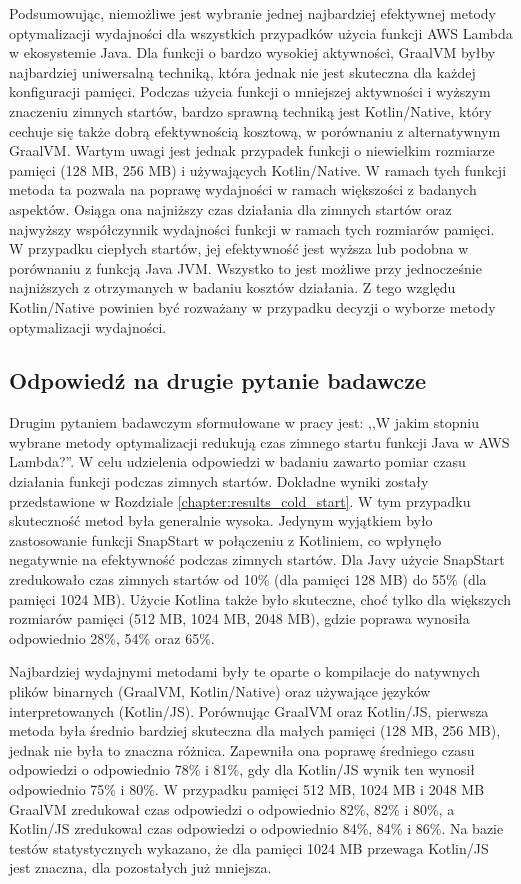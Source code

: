 Podsumowując, niemożliwe jest wybranie jednej najbardziej efektywnej metody optymalizacji wydajności dla wszystkich przypadków użycia funkcji AWS Lambda w ekosystemie Java.
Dla funkcji o bardzo wysokiej aktywności, GraalVM byłby najbardziej uniwersalną techniką, która jednak nie jest skuteczna dla każdej konfiguracji pamięci.
Podczas użycia funkcji o mniejszej aktywności i wyższym znaczeniu zimnych startów, bardzo sprawną techniką jest Kotlin/Native, który cechuje się także dobrą efektywnością kosztową, w porównaniu z alternatywnym GraalVM.
Wartym uwagi jest jednak przypadek funkcji o niewielkim rozmiarze pamięci (128 MB, 256 MB) i używających Kotlin/Native.
W ramach tych funkcji metoda ta pozwala na poprawę wydajności w ramach większości z badanych aspektów.
Osiąga ona najniższy czas działania dla zimnych startów oraz najwyższy współczynnik wydajności funkcji w ramach tych rozmiarów pamięci.
W przypadku ciepłych startów, jej efektywność jest wyższa lub podobna w porównaniu z funkcją Java JVM.
Wszystko to jest możliwe przy jednocześnie najniższych z otrzymanych w badaniu kosztów działania.
Z tego względu Kotlin/Native powinien być rozważany w przypadku decyzji o wyborze metody optymalizacji wydajności.

\subsection*{Odpowiedź na drugie pytanie badawcze}

Drugim pytaniem badawczym sformułowane w pracy jest: ,,W jakim stopniu wybrane metody optymalizacji redukują czas zimnego startu funkcji Java w AWS Lambda?''.
W celu udzielenia odpowiedzi w badaniu zawarto pomiar czasu działania funkcji podczas zimnych startów.
Dokładne wyniki zostały przedstawione w Rozdziale \ref{chapter:results_cold_start}.
W tym przypadku skuteczność metod była generalnie wysoka.
Jedynym wyjątkiem było zastosowanie funkcji SnapStart w połączeniu z Kotliniem, co wpłynęło negatywnie na efektywność podczas zimnych startów.
Dla Javy użycie SnapStart zredukowało czas zimnych startów od 10\% (dla pamięci 128 MB) do 55\% (dla pamięci 1024 MB).
Użycie Kotlina także było skuteczne, choć tylko dla większych rozmiarów pamięci (512 MB, 1024 MB, 2048 MB), gdzie poprawa wynosiła odpowiednio 28\%, 54\% oraz 65\%.

Najbardziej wydajnymi metodami były te oparte o kompilacje do natywnych plików binarnych (GraalVM, Kotlin/Native) oraz używające języków interpretowanych (Kotlin/JS).
Porównując GraalVM oraz Kotlin/JS, pierwsza metoda była średnio bardziej skuteczna dla małych pamięci (128 MB, 256 MB), jednak nie była to znaczna różnica.
Zapewniła ona poprawę średniego czasu odpowiedzi o odpowiednio 78\% i 81\%, gdy dla Kotlin/JS wynik ten wynosił odpowiednio 75\% i 80\%.
W przypadku pamięci 512 MB, 1024 MB i 2048 MB GraalVM zredukował czas odpowiedzi o odpowiednio 82\%, 82\% i 80\%, a Kotlin/JS zredukował czas odpowiedzi o odpowiednio 84\%, 84\% i 86\%.
Na bazie testów statystycznych wykazano, że dla pamięci 1024 MB przewaga Kotlin/JS jest znaczna, dla pozostałych już mniejsza.

